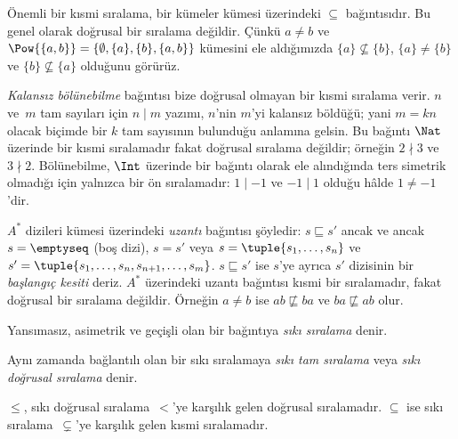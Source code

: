 \begin{ex}
Önemli bir kısmi sıralama, bir kümeler kümesi üzerindeki $\subseteq$
bağıntısıdır. Bu genel olarak doğrusal bir sıralama değildir. Çünkü $a \neq b$
ve $\Pow{\{a, b\}}=\{\emptyset, \{a\}, \{b\}, \{a,b\}\}$ kümesini ele
aldığımızda $\{a\} \nsubseteq \{b\}$, $\{a\} \neq \{b\}$ ve
$\{b\} \nsubseteq \{a\}$ olduğunu görürüz.
\end{ex}

\begin{ex}
\emph{Kalansız bölünebilme} bağıntısı bize doğrusal olmayan bir kısmi sıralama
verir. $n$ ve~$m$ tam sayıları için $n \mid m$ yazımı, $n$'nin $m$'yi kalansız
böldüğü; yani $m=kn$ olacak biçimde bir $k$ tam sayısının bulunduğu anlamına
gelsin. Bu bağıntı $\Nat$ üzerinde bir kısmi sıralamadır fakat doğrusal sıralama
değildir; örneğin $2 \nmid 3$ ve $3 \nmid 2$. Bölünebilme, $\Int$ üzerinde bir
bağıntı olarak ele alındığında ters simetrik olmadığı için yalnızca bir ön
sıralamadır: $1 \mid -1$ ve $-1 \mid 1$ olduğu hâlde $1 \neq -1$'dir.
\end{ex}

\begin{ex}
$A^*$ dizileri kümesi üzerindeki \emph{uzantı} bağıntısı şöyledir:
$s \sqsubseteq s'$ ancak ve ancak $s=\emptyseq$ (boş dizi), $s=s'$ veya
$s=\tuple{s_1, \dots, s_n}$ ve
$s'=\tuple{s_1, \dots, s_n, s_{n+1}, \dots, s_m}$. $s \sqsubseteq s'$ ise
$s$'ye ayrıca $s'$ dizisinin bir \emph{başlangıç kesiti} deriz. $A^*$
üzerindeki uzantı bağıntısı kısmi bir sıralamadır, fakat doğrusal bir sıralama
değildir. Örneğin $a \neq b$ ise $ab \not\sqsubseteq ba$ ve
$ba \not\sqsubseteq ab$ olur.
\end{ex}

\begin{defn}
Yansımasız, asimetrik ve geçişli olan bir bağıntıya \emph{sıkı sıralama} denir.
\end{defn}

\begin{defn}
Aynı zamanda bağlantılı olan bir sıkı sıralamaya \emph{sıkı tam sıralama} veya
\emph{sıkı doğrusal sıralama} denir.
\end{defn}

\begin{ex}
$\le$, sıkı doğrusal sıralama~$<$'ye karşılık gelen doğrusal sıralamadır.
$\subseteq$ ise sıkı sıralama~$\subsetneq$'ye karşılık gelen kısmi sıralamadır.
\end{ex}

